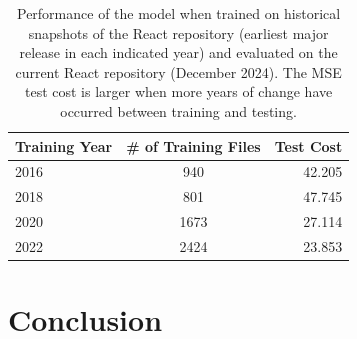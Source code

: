 \documentclass{article}
\begin{document}
\begin{table}[ht]
  \centering
  \begin{tabular}{lcr}
    \toprule
    \textbf{Training Year}
         & \textbf{\# of Training Files}
         & \textbf{Test Cost}                     \\
    \midrule
    2016 & 940                           & 42.205 \\
    2018 & 801                           & 47.745 \\
    2020 & 1673                          & 27.114 \\
    2022 & 2424                          & 23.853 \\
    \bottomrule
  \end{tabular}
  \caption{Performance of the model when trained on historical snapshots of the React repository (earliest major release in each indicated year) and evaluated on the current React repository (December 2024). The MSE test cost is larger when more years of change have occurred between training and testing.}
  \label{tab:historical-transfer}
\end{table}

\section{Conclusion}


\printbibliography
\end{document}
